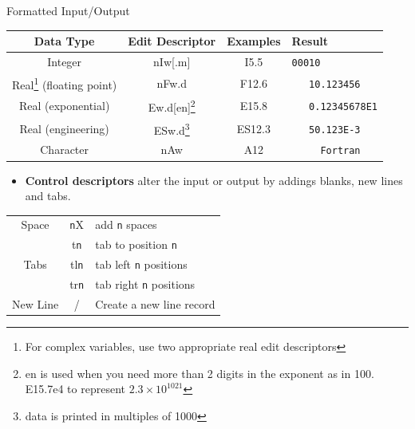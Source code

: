\documentclass[c,mathserif,compress,xcolor=svgnames]{beamer}
\begin{document}
\begin{frame}{Formatted Input/Output}
\begin{minipage}{\textwidth}
\begin{center}
      \scriptsize
      \begin{tabular}{|c|c|c|l|}
        \hline
        Data Type & Edit Descriptor & Examples & Result\\
        \hline
        Integer & nIw[.m] & I5.5 & \lstinline[showspaces=true]|00010|\\
        Real\footnote{\tiny For complex variables, use two appropriate real edit descriptors } (floating point) & nFw.d & F12.6 & \lstinline[showspaces=true]|   10.123456|\\
        Real (exponential) & Ew.d[en]\footnote{\tiny en is used when you need more than 2 digits in the exponent as in 100. E15.7e4 to represent $2.3\times10^{1021}$} & E15.8 & \lstinline[showspaces=true]|   0.12345678E1| \\
        Real (engineering) &  ESw.d\footnote{\tiny data is printed in multiples of 1000} & ES12.3 & \lstinline[showspaces=true]|   50.123E-3| \\
        Character & nAw & A12 & \lstinline[showspaces=true]|     Fortran| \\
        \hline
      \end{tabular}
    \end{center}
  \end{minipage}
  \begin{itemize}
    \item \textbf{Control descriptors} alter the input or output by addings blanks, new lines and tabs.
  \end{itemize}
  \begin{center}
    \scriptsize
    \begin{tabular}{|c|c|l|}
      \hline
      Space & \texttt{n}X & add \texttt{n} spaces \\
      \multirow{3}{*}{Tabs} & t\texttt{n} & tab to position \texttt{n} \\
      & tl\texttt{n} & tab left \texttt{n} positions \\
      & tr\texttt{n} & tab right \texttt{n} positions \\
      New Line & / & Create a new line record \\
      \hline
    \end{tabular}
  \end{center}
\end{frame}
\end{document}
